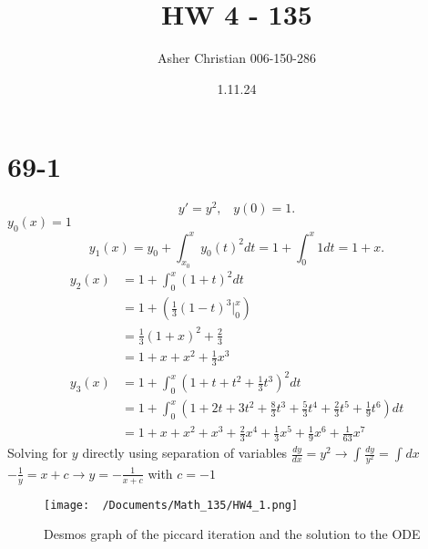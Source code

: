 \documentclass{article}
\title{HW 4 - 135}
\author{Asher Christian 006-150-286}
\date{1.11.24}
\begin{document}
    \maketitle
    \section{69-1}
    \[
    y' = y^2, \; \; \; y(0) = 1
    .\] 
    $y_0(x)=1$ 
    \[
    y_1(x) = y_0 + \int_{x_0}^{x}y_0(t)^2dt = 1 + \int_{0}^{x}1dt = 1 + x
    .\] 
    \begin{align*}
        y_2(x) &= 1 + \int_{0}^{x}(1+t)^2dt\\
               &= 1 +  (\frac{1}{3}(1-t)^3 \Big|_0^x)\\
               &= \frac{1}{3}(1+x)^2+\frac{2}{3}\\
               &= 1 + x + x^2 +\frac{1}{3}x^3\\
        y_3(x) &= 1 + \int_{0}^{x}(1+t+t^2+\frac{1}{3}t^{3})^2dt\\
               &= 1 + \int_{0}^{x}(1+2t+3t^2+\frac{8}{3}t^{3}+\frac{5}{3}t^{4}+\frac{2}{3}t^{5}+\frac{1}{9}t^{6})dt\\
               &= 1 + x + x^2 + x^{3} + \frac{2}{3}x^4 + \frac{1}{3}x^5 + \frac{1}{9}x^6 + \frac{1}{63}x^7
    \end{align*}
    Solving for $y$ directly using separation of variables
    $\frac{dy}{dx} = y^2 \rightarrow \int_{}^{}\frac{dy}{y^2} = \int_{}^{}dx$\\
    $-\frac{1}{y} = x + c \rightarrow y = -\frac{1}{x+c}$ with $c = -1$
    \begin{figure}[H]
        \centering
        \texttt{[image: ~/Documents/Math\_135/HW4\_1.png]}
        \caption{Desmos graph of the piccard iteration and the solution to the ODE}
        \label{fig:your_label}
    \end{figure}
\end{document}
